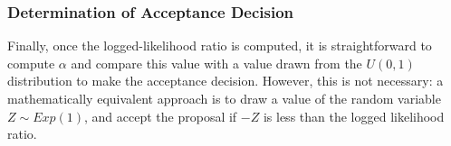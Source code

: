\documentclass[12pt]{article}
\begin{document}
	\subsubsection{Determination of Acceptance Decision}
	Finally, once the logged-likelihood ratio is computed, it is straightforward to compute $\alpha$ and compare this value with a value drawn from the $U(0,1)$ distribution to make the acceptance decision. However, this is not necessary: a mathematically equivalent approach is to draw a value of the random variable $Z\sim Exp(1)$, and accept the proposal if $-Z$ is less than the logged likelihood ratio.
\end{document}

